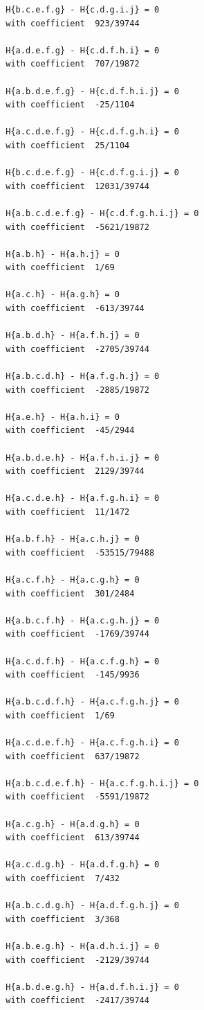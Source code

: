 \documentclass[11pt, a4paper]{kybernetika}
\begin{document}
\begin{verbatim}
		H{b.c.e.f.g} - H{c.d.g.i.j} = 0
		with coefficient  923/39744
		
		H{a.d.e.f.g} - H{c.d.f.h.i} = 0
		with coefficient  707/19872
		
		H{a.b.d.e.f.g} - H{c.d.f.h.i.j} = 0
		with coefficient  -25/1104
		
		H{a.c.d.e.f.g} - H{c.d.f.g.h.i} = 0
		with coefficient  25/1104
		
		H{b.c.d.e.f.g} - H{c.d.f.g.i.j} = 0
		with coefficient  12031/39744
		
		H{a.b.c.d.e.f.g} - H{c.d.f.g.h.i.j} = 0
		with coefficient  -5621/19872
		
		H{a.b.h} - H{a.h.j} = 0
		with coefficient  1/69
		
		H{a.c.h} - H{a.g.h} = 0
		with coefficient  -613/39744
		
		H{a.b.d.h} - H{a.f.h.j} = 0
		with coefficient  -2705/39744
		
		H{a.b.c.d.h} - H{a.f.g.h.j} = 0
		with coefficient  -2885/19872
		
		H{a.e.h} - H{a.h.i} = 0
		with coefficient  -45/2944
		
		H{a.b.d.e.h} - H{a.f.h.i.j} = 0
		with coefficient  2129/39744
		
		H{a.c.d.e.h} - H{a.f.g.h.i} = 0
		with coefficient  11/1472
		
		H{a.b.f.h} - H{a.c.h.j} = 0
		with coefficient  -53515/79488
		
		H{a.c.f.h} - H{a.c.g.h} = 0
		with coefficient  301/2484
		
		H{a.b.c.f.h} - H{a.c.g.h.j} = 0
		with coefficient  -1769/39744
		
		H{a.c.d.f.h} - H{a.c.f.g.h} = 0
		with coefficient  -145/9936
		
		H{a.b.c.d.f.h} - H{a.c.f.g.h.j} = 0
		with coefficient  1/69
		
		H{a.c.d.e.f.h} - H{a.c.f.g.h.i} = 0
		with coefficient  637/19872
		
		H{a.b.c.d.e.f.h} - H{a.c.f.g.h.i.j} = 0
		with coefficient  -5591/19872
		
		H{a.c.g.h} - H{a.d.g.h} = 0
		with coefficient  613/39744
		
		H{a.c.d.g.h} - H{a.d.f.g.h} = 0
		with coefficient  7/432
		
		H{a.b.c.d.g.h} - H{a.d.f.g.h.j} = 0
		with coefficient  3/368
		
		H{a.b.e.g.h} - H{a.d.h.i.j} = 0
		with coefficient  -2129/39744
		
		H{a.b.d.e.g.h} - H{a.d.f.h.i.j} = 0
		with coefficient  -2417/39744
		

\end{verbatim}
\end{document}
